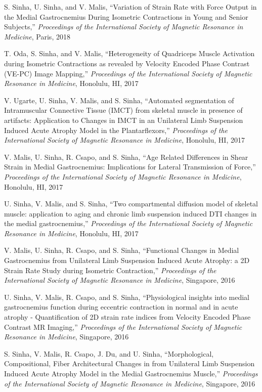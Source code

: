 \begin{frontmatter}
\begin{vitapage}
\begin{talks}
	\item S. Sinha, U. Sinha, and V. Malis, ``Variation of Strain Rate with Force Output in the Medial Gastrocnemius During Isometric Contractions in Young and Senior Subjects,'' \emph{Proceedings of the International Society of Magnetic Resonance in Medicine}, Paris, 2018	
	\item T. Oda, S. Sinha, and V. Malis, ``Heterogeneity of Quadriceps Muscle Activation during Isometric Contractions as revealed by Velocity Encoded Phase Contrast (VE-PC) Image Mapping,'' \emph{Proceedings of the International Society of Magnetic Resonance in Medicine}, Honolulu, HI, 2017	
	\item V. Ugarte, U. Sinha, V. Malis, and S. Sinha, ``Automated segmentation of Intramuscular Connective Tissue (IMCT) from skeletal muscle in presence of artifacts: Application to Changes in IMCT in an Unilateral Limb Suspension Induced Acute Atrophy Model in the Plantarflexors,'' \emph{Proceedings of the International Society of Magnetic Resonance in Medicine}, Honolulu, HI, 2017
	\item V. Malis, U. Sinha, R. Csapo, and S. Sinha, ``Age Related Differences in Shear Strain in Medial Gastrocnemius: Implications for Lateral Transmission of Force,'' \emph{Proceedings of the International Society of Magnetic Resonance in Medicine}, Honolulu, HI, 2017
	\item U. Sinha, V. Malis, and S. Sinha, ``Two compartmental diffusion model of skeletal muscle: application to aging and chronic limb suspension induced DTI changes in the medial gastrocnemius,'' \emph{Proceedings of the International Society of Magnetic Resonance in Medicine}, Honolulu, HI, 2017
	\item V. Malis, U. Sinha, R. Csapo, and S. Sinha, ``Functional Changes in Medial Gastrocnemius from Unilateral Limb Suspension Induced Acute Atrophy: a 2D Strain Rate Study during Isometric Contraction,'' \emph{Proceedings of the International Society of Magnetic Resonance in Medicine}, Singapore, 2016
	\item U. Sinha, V. Malis, R. Csapo, and S. Sinha, ``Physiological insights into medial gastrocnemius function during eccentric contraction in normal and in acute atrophy - Quantification of 2D strain rate indices from Velocity Encoded Phase Contrast MR Imaging,'' \emph{Proceedings of the International Society of Magnetic Resonance in Medicine}, Singapore, 2016
	\item S. Sinha, V. Malis, R. Csapo, J. Du, and U. Sinha, ``Morphological, Compositional, Fiber Architectural Changes in from Unilateral Limb Suspension Induced Acute Atrophy Model in the Medial Gastrocnemius Muscle,'' \emph{Proceedings of the International Society of Magnetic Resonance in Medicine}, Singapore, 2016

\end{talks}
\end{vitapage}
\end{frontmatter}
